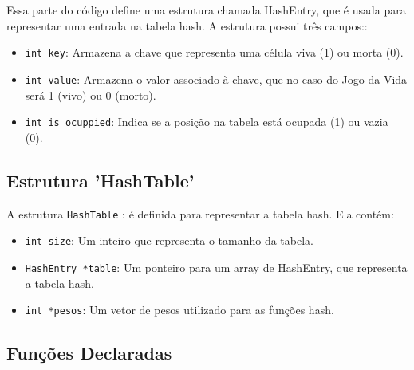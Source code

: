 \documentclass{article}
\begin{document}
 \par Essa parte do código define uma estrutura chamada HashEntry, que é usada para representar uma entrada na tabela hash. A estrutura possui três campos::

\begin{itemize}

\item \verb|int key|: Armazena a chave que representa uma célula viva (1) ou morta (0).

\item \verb|int value|: Armazena o valor associado à chave, que no caso do Jogo da Vida será 1 (vivo) ou 0 (morto).

\item \verb|int is_ocuppied|: Indica se a posição na tabela está ocupada (1) ou vazia (0).

 \end{itemize}
 

 \subsection{Estrutura 'HashTable'}

A estrutura \verb|HashTable| : é definida para representar a tabela hash. Ela contém:

\begin{itemize}
    \item \verb|int size|: Um inteiro que representa o tamanho da tabela. 
    \item \verb|HashEntry *table|: Um ponteiro para um array de HashEntry, que representa a tabela hash.
    \item     \verb|int *pesos|: Um vetor de pesos utilizado para as funções hash. 
 
\end{itemize}

 \subsection{Funções Declaradas}
\end{document}
